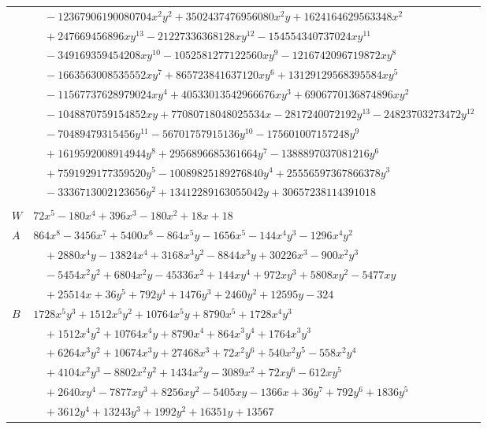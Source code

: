\documentclass[11pt]{article}
\begin{document}
\begin{longtable}{@{}ll@{}}
 & $\quad -12367906190080704x^{2}y^{2}+3502437476956080x^{2}y+1624164629563348x^{2}$\\
 & $\quad +247669456896xy^{13}-21227336368128xy^{12}-154554340737024xy^{11}$\\
 & $\quad -349169359454208xy^{10}-1052581277122560xy^{9}-1216742096719872xy^{8}$\\
 & $\quad -1663563008535552xy^{7}+865723841637120xy^{6}+13129129568395584xy^{5}$\\
 & $\quad -11567737628979024xy^{4}+40533013542966676xy^{3}+6906770136874896xy^{2}$\\
 & $\quad -1048870759154852xy+77080718048025534x-2817240072192y^{13}-24823703273472y^{12}$\\
 & $\quad -70489479315456y^{11}-56701757915136y^{10}-175601007157248y^{9}$\\
 & $\quad +1619592008914944y^{8}+2956896685361664y^{7}-1388897037081216y^{6}$\\
 & $\quad +7591929177359520y^{5}-10089825189276840y^{4}+25556597367866378y^{3}$\\
 & $\quad -3336713002123656y^{2}+13412289163055042y+30657238114391018$\\
\addlinespace[3pt]
\multicolumn{2}{@{}l}{$i=43$, $m=18$, neighbours $22,24,42,55,77,80$}\\
$W$ & $72x^{5}-180x^{4}+396x^{3}-180x^{2}+18x+18$\\
$A$ & $864x^{8}-3456x^{7}+5400x^{6}-864x^{5}y-1656x^{5}-144x^{4}y^{3}-1296x^{4}y^{2}$\\
 & $\quad +2880x^{4}y-13824x^{4}+3168x^{3}y^{2}-8844x^{3}y+30226x^{3}-900x^{2}y^{3}$\\
 & $\quad -5454x^{2}y^{2}+6804x^{2}y-45336x^{2}+144xy^{4}+972xy^{3}+5808xy^{2}-5477xy$\\
 & $\quad +25514x+36y^{5}+792y^{4}+1476y^{3}+2460y^{2}+12595y-324$\\
$B$ & $1728x^{5}y^{3}+1512x^{5}y^{2}+10764x^{5}y+8790x^{5}+1728x^{4}y^{3}$\\
 & $\quad +1512x^{4}y^{2}+10764x^{4}y+8790x^{4}+864x^{3}y^{4}+1764x^{3}y^{3}$\\
 & $\quad +6264x^{3}y^{2}+10674x^{3}y+27468x^{3}+72x^{2}y^{6}+540x^{2}y^{5}-558x^{2}y^{4}$\\
 & $\quad +4104x^{2}y^{3}-8802x^{2}y^{2}+1434x^{2}y-3089x^{2}+72xy^{6}-612xy^{5}$\\
 & $\quad +2640xy^{4}-7877xy^{3}+8256xy^{2}-5405xy-1366x+36y^{7}+792y^{6}+1836y^{5}$\\
 & $\quad +3612y^{4}+13243y^{3}+1992y^{2}+16351y+13567$\\

\end{longtable}
\end{document}
